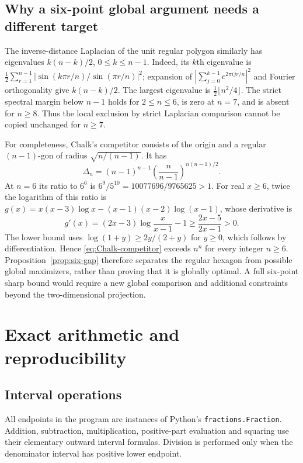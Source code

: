 \documentclass[11pt]{article}
\theoremstyle{remark}
\numberwithin{equation}{section}
\begin{document}
\subsection{Why a six-point global argument needs a different target}
The inverse-distance Laplacian of the unit regular polygon similarly
has eigenvalues $k(n-k)/2$, $0\le k\le n-1$.
Indeed, its $k$th eigenvalue is
$\frac12\sum_{r=1}^{n-1}
|\sin(k\pi r/n)/\sin(\pi r/n)|^2$; expansion of
$|\sum_{j=0}^{k-1}e^{2\pi i jr/n}|^2$ and Fourier orthogonality
give $k(n-k)/2$.
The largest eigenvalue is $\frac12\lfloor n^2/4\rfloor$.
The strict spectral margin below $n-1$ holds for $2\le n\le6$, is zero
at $n=7$, and is absent for $n\ge8$. Thus the local exclusion by strict
Laplacian comparison cannot be copied unchanged for $n\ge7$.

For completeness, Chalk's competitor consists of the origin and a
regular $(n-1)$-gon of radius $\sqrt{n/(n-1)}$. It has
\begin{equation}\label{eq:Chalk-competitor}
 \Delta_n=(n-1)^{n-1}
       \left(\frac n{n-1}\right)^{n(n-1)/2}.
\end{equation}
At $n=6$ its ratio to $6^6$ is
$6^9/5^{10}=10077696/9765625>1$.
For real $x\ge6$, twice the logarithm of this ratio is
$g(x)=x(x-3)\log x-(x-1)(x-2)\log(x-1)$, whose derivative is
\[
 g'(x)=(2x-3)\log\frac{x}{x-1}-1
 \ge\frac{2x-5}{2x-1}>0.
\]
The lower bound uses
$\log(1+y)\ge2y/(2+y)$ for $y\ge0$, which follows by
differentiation. Hence \eqref{eq:Chalk-competitor} exceeds $n^n$
for every integer $n\ge6$.
Proposition~\ref{prop:six-gap} therefore separates the regular hexagon
from possible global maximizers, rather than proving that it is
globally optimal. A full six-point sharp bound would require a new
global comparison and additional constraints beyond the
two-dimensional projection.


\appendix
\section{Exact arithmetic and reproducibility}\label{app:certificate}
\subsection{Interval operations}
All endpoints in the program are instances of Python's
\texttt{fractions.Fraction}. Addition, subtraction, multiplication,
positive-part evaluation and squaring use their elementary outward
interval formulas. Division is performed only when the denominator
interval has positive lower endpoint.
\end{document}

